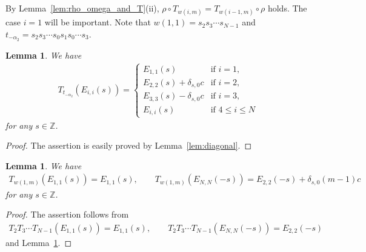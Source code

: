 \documentclass[pdftex]{sigma}
\newtheorem{lem}[thm]{Lemma}
\theoremstyle{definition}
\numberwithin{equation}{section}
\newcommand{\bbZ}{\mathbb{Z}}
\begin{document}
By Lemma~\ref{lem:rho_omega_and_T}(ii), $\rho \circ T_{w(i,m)} = T_{w(i-1,m)} \circ \rho$ holds. The case $i=1$ will be important. Note that $w(1,1)=s_2 s_3 \cdots s_{N-1}$ and $t_{-\alpha_2} = s_2 s_3 \cdots s_0 s_1 s_0 \cdots s_3$.
\begin{lem}\label{lem:diagonal2}We have
\begin{gather*}
T_{t_{-\alpha_2}}(E_{i,i}(s)) = \begin{cases}
E_{1,1}(s) & \text{if $i=1$}, \\
E_{2,2}(s) + \delta_{s,0}c & \text{if $i=2$}, \\
E_{3,3}(s) - \delta_{s,0}c & \text{if $i=3$}, \\
E_{i,i}(s) & \text{if $4 \leq i \leq N$}
\end{cases}
\end{gather*}
for any $s \in \bbZ$.
\end{lem}
\begin{proof}The assertion is easily proved by Lemma~\ref{lem:diagonal}.
\end{proof}
\begin{lem}\label{lem:i=1_partial}We have
\begin{gather*}
T_{w(1,m)}(E_{1,1}(s)) = E_{1,1}(s),\qquad T_{w(1,m)}(E_{N,N}(-s)) = E_{2,2}(-s) + \delta_{s,0}(m-1)c
\end{gather*}
for any $s \in \bbZ$.
\end{lem}
\begin{proof}The assertion follows from
\begin{gather*}
T_2 T_3 \cdots T_{N-1} (E_{1,1}(s)) = E_{1,1}(s), \qquad T_2 T_3 \cdots T_{N-1} (E_{N,N}(-s)) = E_{2,2}(-s)
\end{gather*}
and Lemma~\ref{lem:diagonal2}.
\end{proof}
\end{document}

